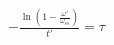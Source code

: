 \documentclass[preview]{standalone}
\begin{document}
\begin{center}
$-\frac{\ln\left(1-\frac{\omega'}{\omega_{ss}}\right)}{t'}=\tau$
\end{center}
\end{document}
